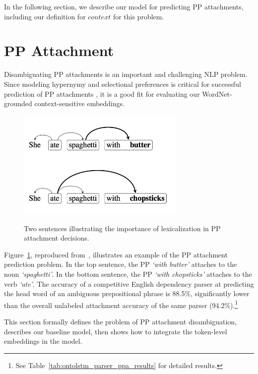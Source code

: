 In the following section, we describe our model for predicting PP attachments, including our definition for $\textit{context}$ for this problem.

\section{PP Attachment}\label{sec:ontolstm_pp_model}
Disambiguating PP attachments is an important and challenging NLP problem. Since modeling hypernymy and selectional preferences is critical for successful prediction of PP attachments \citep{resnik:93}, it is a good fit for evaluating our WordNet-grounded context-sensitive embeddings.

\begin{figure}[t]
\begin{center}
\includegraphics[width=3.2in]{figures/pp_attachment_example.png}\label{fig:ontolstm_pp_example}
\caption{Two sentences illustrating the importance
of lexicalization in PP attachment decisions.}
\end{center}
\end{figure}

Figure~\ref{fig:ontolstm_pp_example}, reproduced from~\cite{belinkov2014exploring}, illustrates an example of the PP attachment prediction problem.
In the top sentence, the PP \textit{`with butter'} attaches to the noun \textit{`spaghetti'}. 
In the bottom sentence, the PP \textit{`with chopsticks'} attaches to the verb \textit{`ate'}.
The accuracy of a competitive English dependency parser at predicting the head word of an ambiguous prepositional phrase is 88.5\%, significantly lower than the overall unlabeled attachment accuracy of the same parser (94.2\%).\footnote{See Table~\ref{tab:ontolstm_parser_ppa_results} for detailed results.}

This section formally defines the problem of PP attachment disambiguation, describes our baseline model, then shows how to integrate the token-level embeddings in the model.

